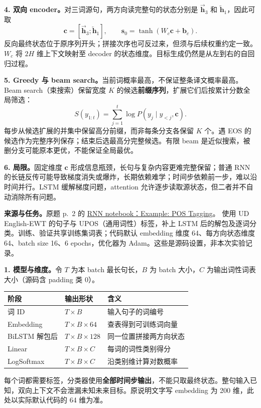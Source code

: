 \textbf{4. 双向 encoder。}对三词源句，两方向读完整句的状态分别是 $\overrightarrow{\mathbf h}_3$ 和 $\overleftarrow{\mathbf h}_1$，因此可取
\[
 \boxed{\mathbf c=[\overrightarrow{\mathbf h}_3;\overleftarrow{\mathbf h}_1],
 \qquad \mathbf s_0=\tanh(W_c\mathbf c+\mathbf b_c).}
\]
反向最终状态位于原序列开头；拼接次序也可反过来，但须与后续权重约定一致。$W_c$ 将 $2H$ 维上下文映射至 decoder 的状态维度。目标生成仍然是从左到右的自回归过程。

\textbf{5. Greedy 与 beam search。}当前词概率最高，不保证整条译文概率最高。Beam search（束搜索）保留宽度 $K$ 的候选\textbf{前缀序列}，扩展它们后按累计分数全局筛选：
\[
 S(y_{1:t})=\sum_{j=1}^{t}\log P(y_j\mid y_{<j},\mathbf c).
\]
每步从候选扩展的并集中保留高分前缀，而非每条分支各保留 $K$ 个。遇 EOS 的候选作为完整序列保存；结束后选最高分完整候选。有限 beam 是近似搜索，被删分支可能原本更优，不能保证全局最优。

\textbf{6. 局限。}固定维度 $\mathbf c$ 形成信息瓶颈，长句与复杂内容更难完整保留；普通 RNN 的长链反传可能导致梯度消失或爆炸，长期依赖难学；时间步依赖前一步，难以沿时间并行。LSTM 缓解梯度问题，attention 允许逐步读取源状态，但二者并不自动消除所有问题。

\nopagebreak[4]
\textbf{来源与任务。}原题 p.~2 的
\href{https://drive.google.com/file/d/1jZUpCxs8s7pDDHRdHrmyl1XkCafxmFXP/view}{RNN notebook：Example: POS Tagging}。
使用 UD English-EWT 的句子与 UPOS（通用词性）标签，补上 LSTM 后的解包及逐词分类。训练、验证共享训练集词表；代码默认 embedding 维度 64、每方向状态维度 64、batch size 16、6 epochs，优化器为 Adam。这些是源码设置，非本次实验记录。

\textbf{1. 模型与维度。}令 $T$ 为本 batch 最长句长，$B$ 为 batch 大小，$C$ 为输出词性词表大小（源码含 padding 类 0）。
\begin{center}
\small
\begin{tabularx}{\textwidth}{@{}llX@{}}
\toprule
阶段 & 输出形状 & 含义 \\
\midrule
词 ID & $T\times B$ & 输入句子的词编号 \\
Embedding & $T\times B\times64$ & 查表得到可训练词向量 \\
BiLSTM 解包后 & $T\times B\times128$ & 同一位置拼接两方向状态 \\
Linear & $T\times B\times C$ & 每词的词性类别得分 \\
LogSoftmax & $T\times B\times C$ & 沿类别维计算对数概率 \\
\bottomrule
\end{tabularx}
\end{center}
每个词都需要标签，分类器使用\textbf{全部时间步输出}，不能只取最终状态。整句输入已知，双向上下文不会泄漏未知未来目标。原说明文字写 embedding 为 200 维，此处以实际默认代码的 64 维为准。

